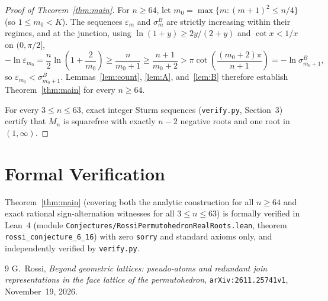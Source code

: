 \documentclass[11pt]{article}
\begin{document}
\begin{proof}[Proof of Theorem~\ref{thm:main}]
For $n \ge 64$, let $m_0 = \max\{m : (m + 1)^2 \le n / 4\}$ (so $1 \le m_0 < K$). The sequences $\varepsilon_m$ and $\sigma^B_m$ are strictly increasing within their regimes, and at the junction, using $\ln(1 + y) \ge 2y/(2 + y)$ and $\cot x < 1/x$ on $(0, \pi/2]$,
\[
  -\ln \varepsilon_{m_0} = \frac{n}{2}\ln\!\left(1 + \frac{2}{m_0}\right) \ge \frac{n}{m_0 + 1} \ge \frac{n + 1}{m_0 + 2} > \pi \cot\!\left(\frac{(m_0 + 2)\pi}{n + 1}\right) = -\ln \sigma^B_{m_0 + 1},
\]
so $\varepsilon_{m_0} < \sigma^B_{m_0 + 1}$. Lemmas~\ref{lem:count}, \ref{lem:A}, and~\ref{lem:B} therefore establish Theorem~\ref{thm:main} for every $n \ge 64$.

For every $3 \le n \le 63$, exact integer Sturm sequences (\texttt{verify.py}, Section~3) certify that $M_n$ is squarefree with exactly $n - 2$ negative roots and one root in $(1, \infty)$.
\end{proof}

\section*{Formal Verification}
Theorem~\ref{thm:main} (covering both the analytic construction for all $n \ge 64$ and exact rational sign-alternation witnesses for all $3 \le n \le 63$) is formally verified in Lean~4 (module \texttt{Conjectures/\allowbreak RossiPermutohedronRealRoots.lean}, theorem \texttt{rossi\_conjecture\_6\_16}) with zero \texttt{sorry} and standard axioms only, and independently verified by \texttt{verify.py}.

\begin{thebibliography}{9}
G.~Rossi,
\emph{Beyond geometric lattices: pseudo-atoms and redundant join representations in the face lattice of the permutohedron},
\texttt{arXiv:2611.25741v1}, November~19, 2026.
\end{thebibliography}
\end{document}
